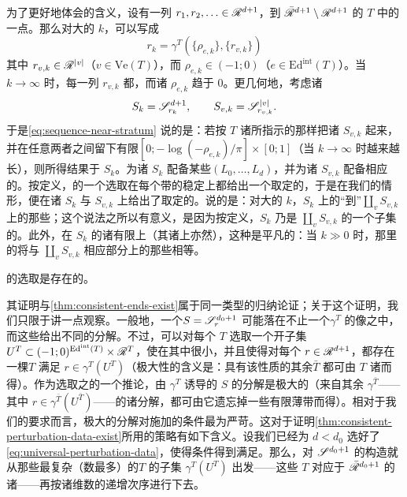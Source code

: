 为了更好地体会\trConsistency{}的含义，设有一列 $r_1,r_2,\ldots\in\mathscr{R}^{d+1}$，\trConvergence{}到 $\bar{\mathscr{R}}^{d+1}\setminus\mathscr{R}^{d+1}$ 的 $T$ \trStratum{}中的一点。那么对大的 $k$，可以写成
\begin{equation}\label{eq:sequence-near-stratum}
r_k=\gamma^T(\{\rho_{e,k}\},\{r_{v,k}\})
\end{equation}
其中 $r_{v,k}\in\mathscr{R}^{|v|}$（$v\in\mathrm{Ve}(T)$），而 $\rho_{e,k}\in(-1;0)$（$e\in\mathrm{Ed}^{\mathrm{int}}(T)$）。当 $k\to\infty$ 时，每一列 $r_{v,k}$ 都\trConvergence，而诸 $\rho_{e,k}$ 趋于 $0$。更几何地，考虑诸\trPointedDisc
\begin{equation*}
S_k=\mathscr{S}^{d+1}_{r_k},\qquad S_{v,k}=\mathscr{S}^{|v|}_{r_{v,k}}.
\end{equation*}
于是\eqref{eq:sequence-near-stratum} 说的是：若按 $T$ 诸\trEdge{}所指示的那样把诸 $S_{v,k}$ \trGluing{}起来，并在任意两者之间留下有限\trStrip{}$[0;-\log(-\rho_{e,k})/\pi]\times[0;1]$（当 $k\to\infty$ 时越来越长），则所得结果\trIsomorphic{}于 $S_k$。为诸 $S_k$ 配备某些\trLagrange\trLabel{}$(L_0,\ldots,L_d)$，并为诸 $S_{v,k}$ 配备相应的\trConsistent\trLabel。按定义，\trPerturbationDatum{}的一个\trUniversal{}选取在每个带\trLagrange\trLabel{}的稳定\trPointedDisc{}上都给出一个取定的\trPerturbationDatum，于是在我们的情形，便在诸 $S_k$ 与 $S_{v,k}$ 上给出了取定的\trPerturbationDatum。\trConsistency{}说的是：对大的 $k$，$S_k$ 上的\trPerturbationDatum{}“\trConvergence{}到”$\coprod_v S_{v,k}$ 上的那些；这个说法之所以有意义，是因为按定义，$S_k$ 乃是 $\coprod_v S_{v,k}$ 的一个子集的\trQuotient。此外，在 $S_k$ 的诸有限\trStrip{}上（其诸\trStriplikeEnd{}上亦然），这种\trConvergence{}是平凡的：当 $k\gg 0$ 时，那里的\trPerturbationDatum{}将与 $\coprod_v S_{v,k}$ 相应部分上的那些相等。
\begin{lemma}\label{thm:consistent-perturbation-data-exist}
\trPerturbationDatum{}的\trConsistent\trUniversal{}选取是存在的。\noqed
\end{lemma}
其证明与\cref{thm:consistent-ends-exist}属于同一类型的归纳论证；关于这个证明，我们只限于讲一点观察。一般地，一个\trSurface{}$S=\mathscr{S}^{d_0+1}_r$ 可能落在不止一个\trGluingMap{}$\gamma^T$ 的像之中，而这些\trGluingMap{}给出不同的\trThickThin{}分解。不过，可以对每个 $T$ 选取一个开子集 $U^T\subset(-1;0)^{\mathrm{Ed}^{\mathrm{int}}(T)}\times\mathscr{R}^T$，使\trGluingParameter{}在其中很小，并且使得对每个 $r\in\mathscr{R}^{d+1}$，都存在一棵\trMaximalTree{}$T$ 满足 $r\in\gamma^T(U^T)$（极大性的含义是：具有该性质的其余\trTree{}$\bar{T}$ 都可由 $T$ \trCollapse{}诸\trEdge{}而得）。作为\trStriplikeEnd{}选取之\trConsistency{}的一个推论，由 $\gamma^T$ 诱导的 $S$ 的\trThickThin{}分解是极大的（来自其余 $\gamma^{\bar{T}}$——其中 $r\in\gamma^{\bar{T}}(U^{\bar{T}})$——的诸分解，都可由它遗忘掉一些有限薄带而得）。相对于我们的\trConsistency{}要求而言，极大的分解对\trPerturbationDatum{}施加的条件最为严苛。这对于证明\cref{thm:consistent-perturbation-data-exist}所用的策略有如下含义。设我们已经为 $d<d_0$ 选好了\trPerturbationDatum{}\eqref{eq:universal-perturbation-data}，使得\trConsistency{}条件得到满足。那么，对 $\mathscr{S}^{d_0+1}$ 的构造就从那些最复杂（\trEdge{}数最多）的\trTree{}$T$ 的子集 $\gamma^T(U^T)$ 出发——这些 $T$ 对应于 $\bar{\mathscr{R}}^{d_0+1}$ 的诸\trVertex——再按\trCompactification{}诸\trBoundaryStratum{}维数的递增次序进行下去。

